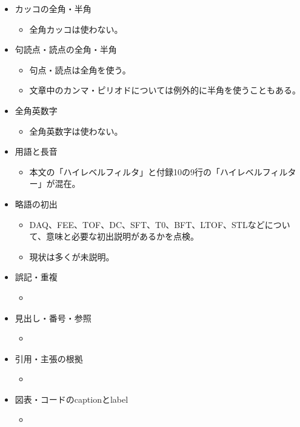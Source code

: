 \documentclass[../main.tex]{subfiles}
\begin{document}
\begin{itemize}
  \item カッコの全角・半角
  \begin{itemize}
    \item 全角カッコは使わない。
  \end{itemize}

  \item 句読点・読点の全角・半角
  \begin{itemize}
    \item 句点・読点は全角を使う。
    \item 文章中のカンマ・ピリオドについては例外的に半角を使うこともある。
  \end{itemize}

  \item 全角英数字
  \begin{itemize}
    \item 全角英数字は使わない。
  \end{itemize}

  \item 用語と長音
  \begin{itemize}
    \item 本文の「ハイレベルフィルタ」と付録10の9行の「ハイレベルフィルター」が混在。
  \end{itemize}

  \item 略語の初出
  \begin{itemize}
    \item DAQ、FEE、TOF、DC、SFT、T0、BFT、LTOF、STLなどについて、意味と必要な初出説明があるかを点検。
    \item 現状は多くが未説明。
  \end{itemize}

  \item 誤記・重複
  \begin{itemize}
    \item 
  \end{itemize}

  \item 見出し・番号・参照
  \begin{itemize}
    \item
  \end{itemize}

  \item 引用・主張の根拠
  \begin{itemize}
    \item
  \end{itemize}

  \item 図表・コードのcaptionとlabel
  \begin{itemize}
    \item
  \end{itemize}

\end{itemize}

\clearpage
\endgroup
\end{document}
